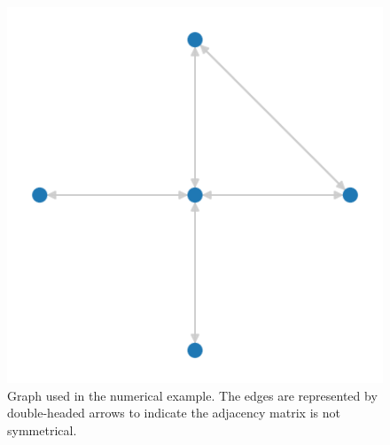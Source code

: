 \begin{figure}
\centering
\includegraphics[width=0.3\linewidth]{thesis/Figures/degenerate_qgft_graph.pdf}
\caption{Graph used in the numerical example. The edges are represented by double-headed arrows to indicate the adjacency matrix is not symmetrical.}
\label{fig:degenerate_qgft_graph}
\end{figure}





